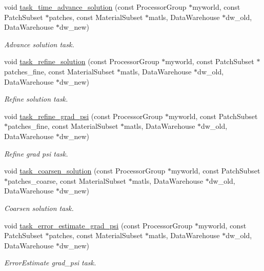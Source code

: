 \begin{DoxyCompactItemize}
void \hyperlink{classUintah_1_1PhaseField_1_1PureMetal_a944d903102e2e3fabcc50cc2396664c0}{task\+\_\+time\+\_\+advance\+\_\+solution} (const Processor\+Group $\ast$myworld, const Patch\+Subset $\ast$patches, const Material\+Subset $\ast$matls, Data\+Warehouse $\ast$dw\+\_\+old, Data\+Warehouse $\ast$dw\+\_\+new)
\begin{DoxyCompactList}\small\item\em Advance solution task. \end{DoxyCompactList}\item 
void \hyperlink{classUintah_1_1PhaseField_1_1PureMetal_a50053ffe793f1c565e32bf3a687c5b18}{task\+\_\+refine\+\_\+solution} (const Processor\+Group $\ast$myworld, const Patch\+Subset $\ast$patches\+\_\+fine, const Material\+Subset $\ast$matls, Data\+Warehouse $\ast$dw\+\_\+old, Data\+Warehouse $\ast$dw\+\_\+new)
\begin{DoxyCompactList}\small\item\em Refine solution task. \end{DoxyCompactList}\item 
void \hyperlink{classUintah_1_1PhaseField_1_1PureMetal_af66b157b0582b6e167dc569e93739922}{task\+\_\+refine\+\_\+grad\+\_\+psi} (const Processor\+Group $\ast$myworld, const Patch\+Subset $\ast$patches\+\_\+fine, const Material\+Subset $\ast$matls, Data\+Warehouse $\ast$dw\+\_\+old, Data\+Warehouse $\ast$dw\+\_\+new)
\begin{DoxyCompactList}\small\item\em Refine grad psi task. \end{DoxyCompactList}\item 
void \hyperlink{classUintah_1_1PhaseField_1_1PureMetal_ad93d54a2b16de3f0a6411e96a3f6ca6a}{task\+\_\+coarsen\+\_\+solution} (const Processor\+Group $\ast$myworld, const Patch\+Subset $\ast$patches\+\_\+coarse, const Material\+Subset $\ast$matls, Data\+Warehouse $\ast$dw\+\_\+old, Data\+Warehouse $\ast$dw\+\_\+new)
\begin{DoxyCompactList}\small\item\em Coarsen solution task. \end{DoxyCompactList}\item 
void \hyperlink{classUintah_1_1PhaseField_1_1PureMetal_a5d8b8723dd879e8226d550f5d7762a67}{task\+\_\+error\+\_\+estimate\+\_\+grad\+\_\+psi} (const Processor\+Group $\ast$myworld, const Patch\+Subset $\ast$patches, const Material\+Subset $\ast$matls, Data\+Warehouse $\ast$dw\+\_\+old, Data\+Warehouse $\ast$dw\+\_\+new)
\begin{DoxyCompactList}\small\item\em Error\+Estimate grad\+\_\+psi task. \end{DoxyCompactList}\item 

\end{DoxyCompactItemize}
